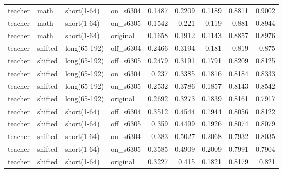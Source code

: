\begin{table}
\begin{tabular}{llllrrrrr}
teacher & math & short(1-64) & on\_s6304 & 0.1487 & 0.2209 & 0.1189 & 0.8811 & 0.9002 \\
teacher & math & short(1-64) & on\_s6305 & 0.1542 & 0.221 & 0.119 & 0.881 & 0.8944 \\
teacher & math & short(1-64) & original & 0.1658 & 0.1912 & 0.1143 & 0.8857 & 0.8976 \\
teacher & shifted & long(65-192) & off\_s6304 & 0.2466 & 0.3194 & 0.181 & 0.819 & 0.875 \\
teacher & shifted & long(65-192) & off\_s6305 & 0.2479 & 0.3191 & 0.1791 & 0.8209 & 0.8125 \\
teacher & shifted & long(65-192) & on\_s6304 & 0.237 & 0.3385 & 0.1816 & 0.8184 & 0.8333 \\
teacher & shifted & long(65-192) & on\_s6305 & 0.2532 & 0.3786 & 0.1857 & 0.8143 & 0.8542 \\
teacher & shifted & long(65-192) & original & 0.2692 & 0.3273 & 0.1839 & 0.8161 & 0.7917 \\
teacher & shifted & short(1-64) & off\_s6304 & 0.3512 & 0.4544 & 0.1944 & 0.8056 & 0.8122 \\
teacher & shifted & short(1-64) & off\_s6305 & 0.359 & 0.4499 & 0.1926 & 0.8074 & 0.8079 \\
teacher & shifted & short(1-64) & on\_s6304 & 0.383 & 0.5027 & 0.2068 & 0.7932 & 0.8035 \\
teacher & shifted & short(1-64) & on\_s6305 & 0.3585 & 0.4909 & 0.2009 & 0.7991 & 0.7904 \\
teacher & shifted & short(1-64) & original & 0.3227 & 0.415 & 0.1821 & 0.8179 & 0.821 \\
\bottomrule
\end{tabular}
\end{table}
